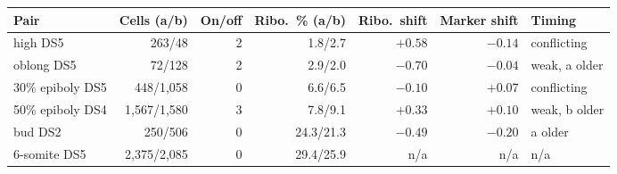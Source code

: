 \begin{tabular}{lrrrrrl}
\toprule
Pair & Cells (a/b) & On/off & Ribo.\ \% (a/b) & Ribo.\ shift & Marker shift & Timing \\
\midrule
high DS5 & 263/48 & 2 & 1.8/2.7 & $+0.58$ & $-0.14$ & conflicting \\
oblong DS5 & 72/128 & 2 & 2.9/2.0 & $-0.70$ & $-0.04$ & weak, a older \\
30\% epiboly DS5 & 448/1{,}058 & 0 & 6.6/6.5 & $-0.10$ & $+0.07$ & conflicting \\
50\% epiboly DS4 & 1{,}567/1{,}580 & 3 & 7.8/9.1 & $+0.33$ & $+0.10$ & weak, b older \\
bud DS2 & 250/506 & 0 & 24.3/21.3 & $-0.49$ & $-0.20$ & a older \\
6-somite DS5 & 2{,}375/2{,}085 & 0 & 29.4/25.9 & n/a & n/a & n/a \\
\bottomrule
\end{tabular}
